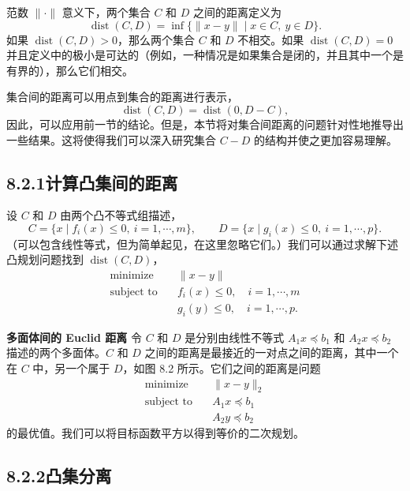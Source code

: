 \documentclass[UTF8, 12pt, fontset=fandol, oneside]{ctexart}
\begin{document}
范数 $\|\cdot\|$ 意义下，两个集合 $C$ 和 $D$ 之间的距离定义为
\[
\operatorname{dist}(C,D)=\inf\{\|x-y\|\mid x\in C,\ y\in D\}.
\]
如果 $\operatorname{dist}(C,D)>0$，那么两个集合 $C$ 和 $D$ 不相交。如果 $\operatorname{dist}(C,D)=0$ 并且定义中的极小是可达的（例如，一种情况是如果集合是闭的，并且其中一个是有界的），那么它们相交。

集合间的距离可以用点到集合的距离进行表示，
\[
\operatorname{dist}(C,D)=\operatorname{dist}(0,D-C),
\]
因此，可以应用前一节的结论。但是，本节将对集合间距离的问题针对性地推导出一些结果。这将使得我们可以深入研究集合 $C-D$ 的结构并使之更加容易理解。

\subsection*{8.2.1\quad 计算凸集间的距离}

设 $C$ 和 $D$ 由两个凸不等式组描述，
\[
C=\{x\mid f_i(x)\leq 0,\ i=1,\cdots,m\},\qquad
D=\{x\mid g_i(x)\leq 0,\ i=1,\cdots,p\}.
\]
（可以包含线性等式，但为简单起见，在这里忽略它们。）我们可以通过求解下述凸规划问题找到 $\operatorname{dist}(C,D)$，
\begin{equation}
\begin{aligned}
\text{minimize}\quad & \|x-y\|\\
\text{subject to}\quad & f_i(x)\leq 0,\quad i=1,\cdots,m\\
& g_i(y)\leq 0,\quad i=1,\cdots,p.
\end{aligned}
\tag{8.3}
\end{equation}

\noindent\textbf{多面体间的 Euclid 距离}\quad
令 $C$ 和 $D$ 是分别由线性不等式 $A_1x\preceq b_1$ 和 $A_2x\preceq b_2$ 描述的两个多面体。$C$ 和 $D$ 之间的距离是最接近的一对点之间的距离，其中一个在 $C$ 中，另一个属于 $D$，如图 8.2 所示。它们之间的距离是问题
\begin{equation}
\begin{aligned}
\text{minimize}\quad & \|x-y\|_2\\
\text{subject to}\quad & A_1x\preceq b_1\\
& A_2y\preceq b_2
\end{aligned}
\tag{8.4}
\end{equation}
的最优值。我们可以将目标函数平方以得到等价的二次规划。

\subsection*{8.2.2\quad 凸集分离}
\end{document}
